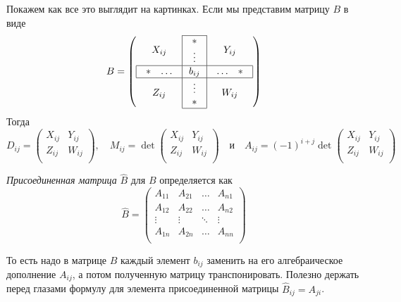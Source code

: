 Покажем как все это выглядит на картинках.
Если мы представим матрицу $B$ в виде
\[
B =
\left(
\begin{array}{c|c|c}
\cline{2-2}
{X_{ij}}&{
\begin{array}{c}
{*}\\{\vdots}
\end{array}
}&{Y_{ij}}\\
\hline
\multicolumn{1}{|c|}{
\begin{array}{cc}
{*}&{\ldots}
\end{array}
}&{b_{ij}}&\multicolumn{1}{c|}{
\begin{array}{cc}
{\ldots}&{*}
\end{array}
}\\
\hline
{Z_{ij}}&{
\begin{array}{c}
{\vdots}\\{*}
\end{array}
}&{W_{ij}}\\
\cline{2-2}
\end{array}
\right)
\]
Тогда
\[
D_{ij} =
\begin{pmatrix}
{X_{ij}}&{Y_{ij}}\\
{Z_{ij}}&{W_{ij}}\\
\end{pmatrix},\quad
M_{ij} = 
\det
\begin{pmatrix}
{X_{ij}}&{Y_{ij}}\\
{Z_{ij}}&{W_{ij}}\\
\end{pmatrix}\quad\text{и}\quad
A_{ij} =
(-1)^{i+j}
\det
\begin{pmatrix}
{X_{ij}}&{Y_{ij}}\\
{Z_{ij}}&{W_{ij}}\\
\end{pmatrix}
\]
\begin{definition}
\label{def::AdjMatrix}
{\it Присоединенная матрица} $\hat B$ для $B$ определяется как
\[
\hat B = 
\begin{pmatrix}
{A_{11}}&{A_{21}}&{\ldots}&{A_{n1}}\\
{A_{12}}&{A_{22}}&{\ldots}&{A_{n2}}\\
{\vdots}&{\vdots}&{\ddots}&{\vdots}\\
{A_{1n}}&{A_{2n}}&{\ldots}&{A_{nn}}\\
\end{pmatrix}
\]
\end{definition}
То есть надо в матрице $B$ каждый элемент $b_{ij}$ заменить на его алгебраическое дополнение $A_{ij}$, а потом полученную матрицу транспонировать.
Полезно держать перед глазами формулу для элемента присоединенной матрицы $\hat B_{ij} = A_{ji}$.

